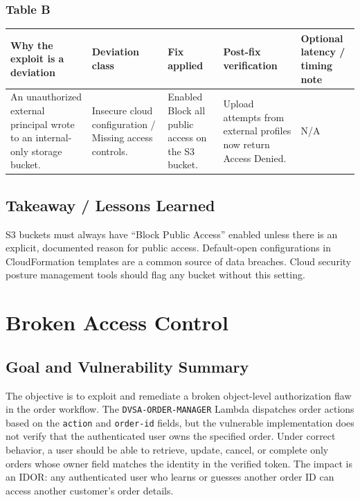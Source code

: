 \documentclass[12pt]{report}
\begin{document}
\subsection*{Table B}
\begin{table}[H]
  \footnotesize
  \centering
  \begin{tabularx}{\textwidth}{|Y|Y|Y|Y|Y|}
    \hline
    \textbf{Why the exploit is a deviation} & \textbf{Deviation class} & \textbf{Fix applied} & \textbf{Post-fix verification} & \textbf{Optional latency / timing note} \\
    \hline
    An unauthorized external principal wrote to an internal-only storage bucket. &
    Insecure cloud configuration / Missing access controls. &
    Enabled Block all public access on the S3 bucket. &
    Upload attempts from external profiles now return Access Denied. &
    N/A \\
    \hline
  \end{tabularx}
\end{table}

\section{Takeaway / Lessons Learned}
S3 buckets must always have ``Block Public Access'' enabled unless there is an explicit, documented reason for public access. Default-open configurations in CloudFormation templates are a common source of data breaches. Cloud security posture management tools should flag any bucket without this setting.

\clearpage

\chapter{Broken Access Control}

\section{Goal and Vulnerability Summary}
The objective is to exploit and remediate a broken object-level authorization flaw in the order workflow. The \texttt{DVSA-ORDER-MANAGER} Lambda dispatches order actions based on the \texttt{action} and \texttt{order-id} fields, but the vulnerable implementation does not verify that the authenticated user owns the specified order. Under correct behavior, a user should be able to retrieve, update, cancel, or complete only orders whose owner field matches the identity in the verified token. The impact is an IDOR: any authenticated user who learns or guesses another order ID can access another customer's order details.
\end{document}
